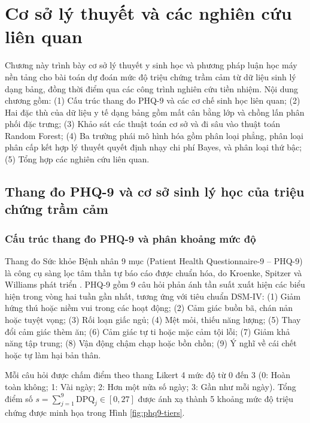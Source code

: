 \chapter{Cơ sở lý thuyết và các nghiên cứu liên quan}
\label{ch:co-so-ly-thuyet}

Chương này trình bày cơ sở lý thuyết y sinh học và phương pháp luận học máy nền tảng cho bài toán dự đoán mức độ triệu chứng trầm cảm từ dữ liệu sinh lý dạng bảng, đồng thời điểm qua các công trình nghiên cứu tiền nhiệm. Nội dung chương gồm: (1) Cấu trúc thang đo PHQ-9 và các cơ chế sinh học liên quan; (2) Hai đặc thù của dữ liệu y tế dạng bảng gồm mất cân bằng lớp và chồng lấn phân phối đặc trưng; (3) Khảo sát các thuật toán cơ sở và đi sâu vào thuật toán Random Forest; (4) Ba trường phái mô hình hóa gồm phân loại phẳng, phân loại phân cấp kết hợp lý thuyết quyết định nhạy chi phí Bayes, và phân loại thứ bậc; (5) Tổng hợp các nghiên cứu liên quan.

\section{Thang đo PHQ-9 và cơ sở sinh lý học của triệu chứng trầm cảm}
\label{sec:thang-do-phq9-va-sinh-ly}

\subsection{Cấu trúc thang đo PHQ-9 và phân khoảng mức độ}
\label{subsec:cau-truc-phq9}

Thang đo Sức khỏe Bệnh nhân 9 mục (Patient Health Questionnaire-9 -- PHQ-9) là công cụ sàng lọc tâm thần tự báo cáo được chuẩn hóa, do Kroenke, Spitzer và Williams phát triển \cite{kroenke2001phq, spitzer1999validation}. PHQ-9 gồm 9 câu hỏi phản ánh tần suất xuất hiện các biểu hiện trong vòng hai tuần gần nhất, tương ứng với tiêu chuẩn DSM-IV: (1) Giảm hứng thú hoặc niềm vui trong các hoạt động; (2) Cảm giác buồn bã, chán nản hoặc tuyệt vọng; (3) Rối loạn giấc ngủ; (4) Mệt mỏi, thiếu năng lượng; (5) Thay đổi cảm giác thèm ăn; (6) Cảm giác tự ti hoặc mặc cảm tội lỗi; (7) Giảm khả năng tập trung; (8) Vận động chậm chạp hoặc bồn chồn; (9) Ý nghĩ về cái chết hoặc tự làm hại bản thân.

Mỗi câu hỏi được chấm điểm theo thang Likert 4 mức độ từ 0 đến 3 (0: Hoàn toàn không; 1: Vài ngày; 2: Hơn một nửa số ngày; 3: Gần như mỗi ngày). Tổng điểm số $s = \sum_{j=1}^9 \text{DPQ}_j \in [0, 27]$ được ánh xạ thành 5 khoảng mức độ triệu chứng được minh họa trong Hình \ref{fig:phq9-tiers}.

